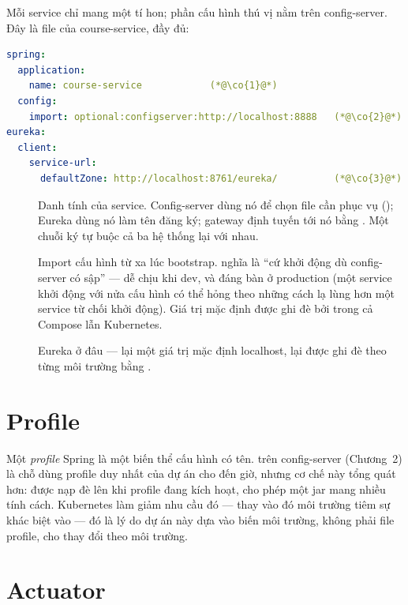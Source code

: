 Mỗi service chỉ mang một  tí hon; phần cấu hình thú
vị nằm trên config-server. Đây là file của course-service, đầy đủ:

\begin{lstlisting}[language=yaml]
spring:
  application:
    name: course-service            (*@\co{1}@*)
  config:
    import: optional:configserver:http://localhost:8888   (*@\co{2}@*)
eureka:
  client:
    service-url:
      defaultZone: http://localhost:8761/eureka/          (*@\co{3}@*)
\end{lstlisting}

\begin{description}
  \item[] Danh tính của service. Config-server dùng nó để chọn file
  cần phục vụ (); Eureka dùng nó
  làm tên đăng ký; gateway định tuyến tới nó bằng
  . Một chuỗi ký tự buộc cả ba hệ thống lại
  với nhau.
  \item[] Import cấu hình từ xa lúc bootstrap.
   nghĩa là ``cứ khởi động dù config-server có sập'' ---
  dễ chịu khi dev, và đáng bàn ở production (một service khởi động với
  nửa cấu hình có thể hỏng theo những cách lạ lùng hơn một service từ
  chối khởi động). Giá trị mặc định  được ghi đè bởi
   trong cả Compose lẫn Kubernetes.
  \item[] Eureka ở đâu --- lại một giá trị mặc định localhost, lại
  được ghi đè theo từng môi trường bằng
  .
\end{description}

\section{Profile}

Một \emph{profile} Spring là một biến thể cấu hình có tên.
 trên config-server (Chương~2) là
chỗ dùng profile duy nhất của dự án cho đến giờ, nhưng cơ chế này tổng
quát hơn:  được nạp đè lên
 khi profile  đang kích hoạt, cho phép
một jar mang nhiều tính cách. Kubernetes làm giảm nhu cầu đó --- thay vào
đó môi trường tiêm sự khác biệt vào --- đó là lý do dự án này dựa vào
biến môi trường, không phải file profile, cho thay đổi theo môi trường.

\section{Actuator}

